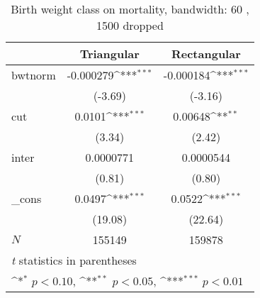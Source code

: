 \begin{table}[htbp]\centering
\def\sym#1{\ifmmode^{#1}\else\(^{#1}\)\fi}
\caption{Birth weight class on mortality, bandwidth: 60 , 1500 dropped}
\begin{tabular}{l*{2}{c}}
\hline\hline
            &\multicolumn{1}{c}{Triangular}&\multicolumn{1}{c}{Rectangular}\\
\hline
bwtnorm     &   -0.000279\sym{***}&   -0.000184\sym{***}\\
            &     (-3.69)         &     (-3.16)         \\
[1em]
cut         &      0.0101\sym{***}&     0.00648\sym{**} \\
            &      (3.34)         &      (2.42)         \\
[1em]
inter       &   0.0000771         &   0.0000544         \\
            &      (0.81)         &      (0.80)         \\
[1em]
\_cons      &      0.0497\sym{***}&      0.0522\sym{***}\\
            &     (19.08)         &     (22.64)         \\
\hline
\(N\)       &      155149         &      159878         \\
\hline\hline
\multicolumn{3}{l}{\footnotesize \textit{t} statistics in parentheses}\\
\multicolumn{3}{l}{\footnotesize \sym{*} \(p<0.10\), \sym{**} \(p<0.05\), \sym{***} \(p<0.01\)}\\
\end{tabular}
\end{table}
